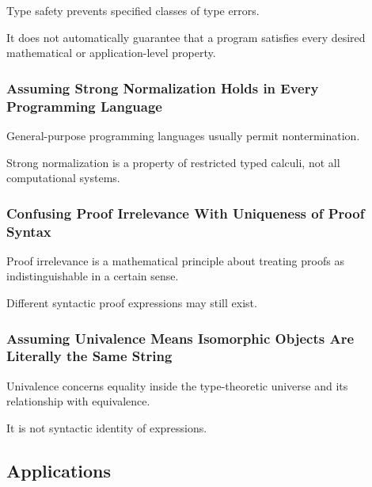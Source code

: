 Type safety prevents specified classes of type errors.

It does not automatically guarantee that a program satisfies every desired
mathematical or application-level property.

\subsubsection{Assuming Strong Normalization Holds in Every Programming Language}

General-purpose programming languages usually permit nontermination.

Strong normalization is a property of restricted typed calculi, not all
computational systems.

\subsubsection{Confusing Proof Irrelevance With Uniqueness of Proof Syntax}

Proof irrelevance is a mathematical principle about treating proofs as
indistinguishable in a certain sense.

Different syntactic proof expressions may still exist.

\subsubsection{Assuming Univalence Means Isomorphic Objects Are Literally the Same String}

Univalence concerns equality inside the type-theoretic universe and its
relationship with equivalence.

It is not syntactic identity of expressions.

\subsection{Applications}
\label{subsec:type-theory-applications}

